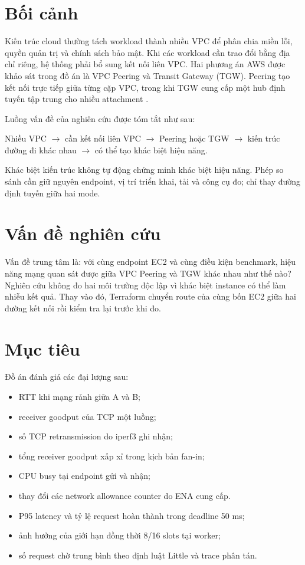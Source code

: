 \section{Bối cảnh}

Kiến trúc cloud thường tách workload thành nhiều VPC để phân chia miền lỗi,
quyền quản trị và chính sách bảo mật. Khi các workload cần trao đổi bằng địa
chỉ riêng, hệ thống phải bổ sung kết nối liên VPC. Hai phương án AWS được khảo
sát trong đồ án là VPC Peering và Transit Gateway (TGW). Peering tạo kết nối
trực tiếp giữa từng cặp VPC, trong khi TGW cung cấp một hub định tuyến tập
trung cho nhiều attachment \cite{aws-vpc-peering,aws-tgw-overview}.

Luồng vấn đề của nghiên cứu được tóm tắt như sau:

\begin{center}
Nhiều VPC $\rightarrow$ cần kết nối liên VPC $\rightarrow$
Peering hoặc TGW $\rightarrow$ kiến trúc đường đi khác nhau
$\rightarrow$ có thể tạo khác biệt hiệu năng.
\end{center}

Khác biệt kiến trúc không tự động chứng minh khác biệt hiệu năng. Phép so sánh
cần giữ nguyên endpoint, vị trí triển khai, tải và công cụ đo; chỉ thay đường
định tuyến giữa hai mode.

\section{Vấn đề nghiên cứu}

Vấn đề trung tâm là: với cùng endpoint EC2 và cùng điều kiện benchmark, hiệu
năng mạng quan sát được giữa VPC Peering và TGW khác nhau như thế nào? Nghiên
cứu không đo hai môi trường độc lập vì khác biệt instance có thể làm nhiễu kết
quả. Thay vào đó, Terraform chuyển route của cùng bốn EC2 giữa hai đường kết
nối rồi kiểm tra lại trước khi đo.

\section{Mục tiêu}

Đồ án đánh giá các đại lượng sau:

\begin{itemize}
  \item RTT khi mạng rảnh giữa A và B;
  \item receiver goodput của TCP một luồng;
  \item số TCP retransmission do iperf3 ghi nhận;
  \item tổng receiver goodput xấp xỉ trong kịch bản fan-in;
  \item CPU busy tại endpoint gửi và nhận;
  \item thay đổi các network allowance counter do ENA cung cấp.
  \item P95 latency và tỷ lệ request hoàn thành trong deadline 50 ms;
  \item ảnh hưởng của giới hạn đồng thời 8/16 slots tại worker;
  \item số request chờ trung bình theo định luật Little và trace phân tán.
\end{itemize}

